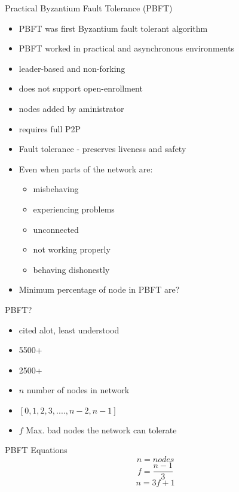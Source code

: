 \documentclass[pdf,table]{beamer}
\begin{document}
\begin{frame}{Practical Byzantium Fault Tolerance (PBFT) \cite{castro1999practical}}
	\begin{itemize}
		\item PBFT was first Byzantium fault tolerant algorithm
		\item PBFT worked in practical and asynchronous environments
		\item leader-based and non-forking
		\item does not support open-enrollment
		\item nodes added by aministrator
		\item requires full P2P
		\item Fault tolerance - preserves liveness and safety
		\item Even when parts of the network are:
			\begin{itemize}
				\item misbehaving
				\item experiencing problems
				\item unconnected
				\item not working properly
				\item behaving dishonestly
			\end{itemize}
		\item Minimum percentage of node in PBFT are?
	\end{itemize}
\end{frame}


\begin{frame}{PBFT? \cite{castro1999practical}}
	\begin{itemize}
		\item cited alot, least understood
		\item \parencite{lamport1982byzantine} 5500+
		\item \parencite{castro1999practical} 2500+
		\item $n$ number of nodes in network
		\item $[0,1,2,3,....,n-2,n-1]$
		\item $f$ Max. bad nodes the network can tolerate 
	\end{itemize}
	\begin{block}{PBFT Equations}
		\begin{equation}
			n=nodes
		\end{equation}
		\begin{equation}
			f=\frac{n-1}{3}
		\end{equation}
		\begin{equation}
			n=3f+1
		\end{equation}
	\end{block}
\end{frame}
\end{document}
